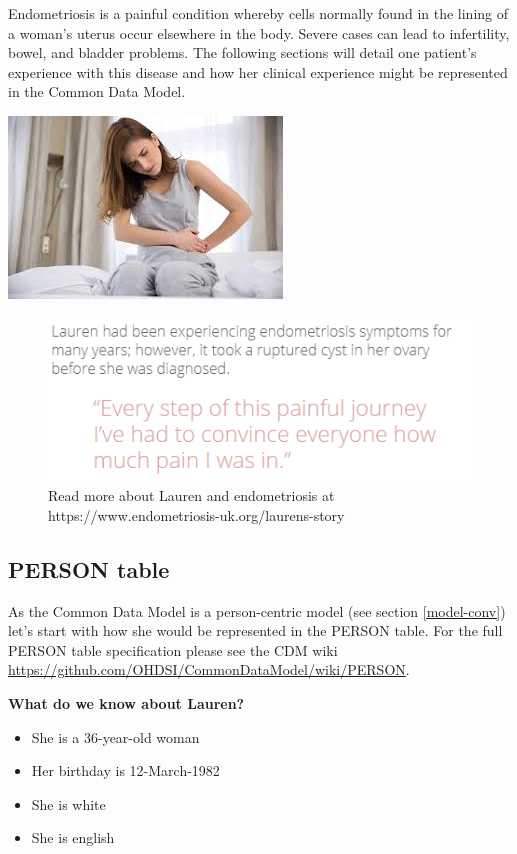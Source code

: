 \documentclass[]{book}
\providecommand{\tightlist}{%
  \setlength{\itemsep}{0pt}\setlength{\parskip}{0pt}}
\begin{document}
Endometriosis is a painful condition whereby cells normally found in the lining of a woman's uterus occur elsewhere in the body. Severe cases can lead to infertility, bowel, and bladder problems. The following sections will detail one patient's experience with this disease and how her clinical experience might be represented in the Common Data Model.

\includegraphics[width=0.5\linewidth]{images/CommonDataModel/Lauren}

\begin{figure}
\includegraphics[width=0.75\linewidth]{images/CommonDataModel/laurentext} \caption{Read more about Lauren and endometriosis at https://www.endometriosis-uk.org/laurens-story}\label{fig:Laurentext}
\end{figure}

\hypertarget{person}{%
\subsection{PERSON table}\label{person}}

As the Common Data Model is a person-centric model (see section \ref{model-conv}) let's start with how she would be represented in the PERSON table. For the full PERSON table specification please see the CDM wiki \url{https://github.com/OHDSI/CommonDataModel/wiki/PERSON}.

\textbf{What do we know about Lauren?}

\begin{itemize}
\tightlist
\item
  She is a 36-year-old woman
\item
  Her birthday is 12-March-1982
\item
  She is white
\item
  She is english
\end{itemize}
\end{document}
